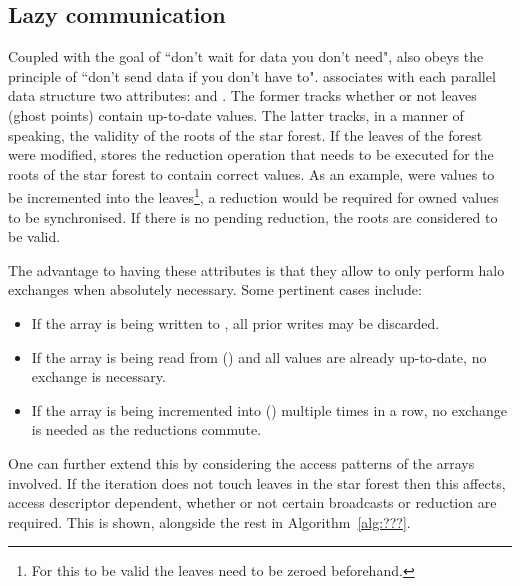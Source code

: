 \subsection{Lazy communication}

Coupled with the goal of ``don't wait for data you don't need",  also obeys the principle of ``don't send data if you don't have to".
 associates with each parallel data structure two attributes:  and .
The former tracks whether or not leaves (ghost points) contain up-to-date values.
The latter tracks, in a manner of speaking, the validity of the roots of the star forest.
If the leaves of the forest were modified,  stores the reduction operation that needs to be executed for the roots of the star forest to contain correct values.
As an example, were values to be incremented into the leaves\footnote{For this to be valid the leaves need to be zeroed beforehand.}, a  reduction would be required for owned values to be synchronised.
If there is no pending reduction, the roots are considered to be valid.

The advantage to having these attributes is that they allow  to only perform halo exchanges when absolutely necessary.
Some pertinent cases include:

\begin{itemize}
  \item If the array is being written to , all prior writes may be discarded.
  \item If the array is being read from () and all values are already up-to-date, no exchange is necessary.
  \item If the array is being incremented into () multiple times in a row, no exchange is needed as the reductions commute.
\end{itemize}

One can further extend this by considering the access patterns of the arrays involved.
If the iteration does not touch leaves in the star forest then this affects, access descriptor dependent, whether or not certain broadcasts or reduction are required.
This is shown, alongside the rest in Algorithm~\ref{alg:???}.

